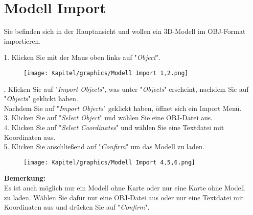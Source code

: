 \chapter{Modell Import}


Sie befinden sich in der Hauptansicht und wollen ein 3D-Modell im OBJ-Format importieren.

1. Klicken Sie mit der Maus oben links auf "\textit{Object}".

\begin{figure}[th]
    \centering
    \texttt{[image: Kapitel/graphics/Modell Import 1,2.png]}
    \label{fig:enter-label}
\end{figure}

. Klicken Sie auf "\textit{Import Objects}", was unter "\textit{Objects}" erscheint, nachdem Sie auf "\textit{Objects}" geklickt haben.\\

Nachdem Sie auf "\textit{Import Objects}" geklickt haben, öffnet sich ein Import Menü.\\

3. Klicken Sie auf "\textit{Select Object}" und wählen Sie eine OBJ-Datei aus.\\
4. Klicken Sie auf "\textit{Select Coordinates}" und wählen Sie eine Textdatei mit Koordinaten aus.\\
5. Klicken Sie anschließend auf "\textit{Confirm}" um das Modell zu laden.

\newpage
\begin{figure}[th]
    \centering
    \texttt{[image: Kapitel/graphics/Modell Import 4,5,6.png]}
    \label{fig:enter-label}
\end{figure}

\textbf{Bemerkung:}\\
Es ist auch möglich nur ein Modell ohne Karte oder nur eine Karte ohne Modell zu laden. Wählen Sie dafür nur eine OBJ-Datei aus oder nur eine Textdatei mit Koordinaten aus und drücken Sie auf "\textit{Confirm}".
